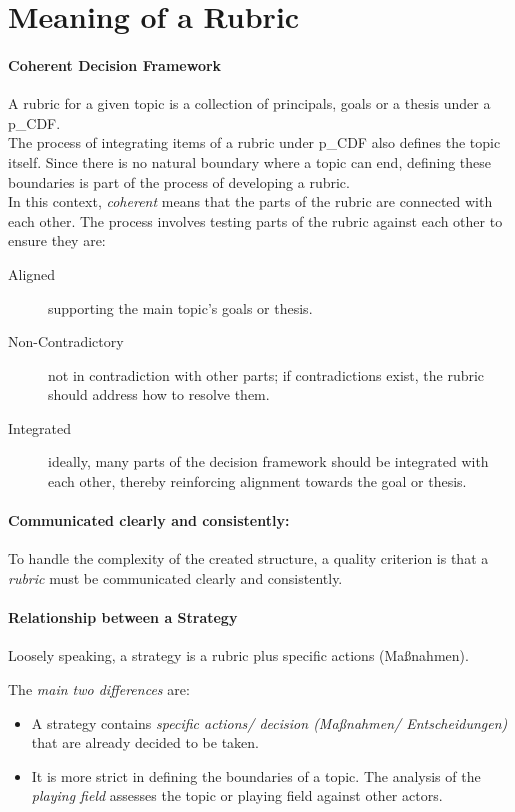 
\section{Meaning of a Rubric}
\label{sec:Rubric}

\paragraph{Coherent Decision Framework}

A rubric for a given topic is a collection of principals, goals or a thesis under a \gls{p_CDF}.\\

The process of integrating items of a rubric under \gls{p_CDF} also defines the topic itself. Since there is no natural boundary where a topic can end, defining these boundaries is part of the process of developing a rubric.\\

In this context, \textit{coherent} means that the parts of the rubric are connected with each other. The process involves testing parts of the rubric against each other to ensure they are:
\begin{description}
    \item[Aligned] supporting the main topic's goals or thesis.
    \item[Non-Contradictory] not in contradiction with other parts; if contradictions exist, the rubric should address how to resolve them.
    \item[Integrated] ideally, many parts of the decision framework should be integrated with each other, thereby reinforcing alignment towards the goal or thesis.
\end{description}

\paragraph{Communicated clearly and consistently:}
To handle the complexity of the created structure, a quality criterion is that a \textit{rubric} must be communicated clearly and consistently.

\paragraph{Relationship between a Strategy}

Loosely speaking, a strategy is a rubric plus specific actions (Maßnahmen).

The \textit{main two differences} are:
\begin{itemize}
	\item A strategy contains \textit{specific actions/ decision (Maßnahmen/ Entscheidungen)} that are already decided to be taken.
	\item It is more strict in defining the boundaries of a topic. The analysis of the \textit{playing field} assesses the topic or playing field against other actors.
\end{itemize} 

